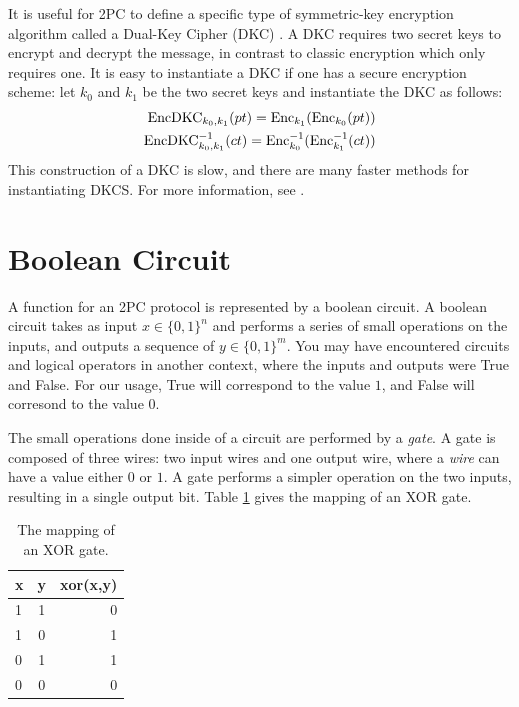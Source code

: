 It is useful for 2PC to define a specific type of symmetric-key encryption algorithm called a Dual-Key Cipher (DKC) \cite{bellare2012foundations}.
A DKC requires two secret keys to encrypt and decrypt the message, in contrast to classic encryption which only requires one.
It is easy to instantiate a DKC if one has a secure encryption scheme: let $k_0$ and $k_1$ be the two secret keys and instantiate the DKC as follows:
\begin{equation}
    \begin{split}
        \operatorname{EncDKC}_{k_0, k_1}(pt) = \operatorname{Enc}_{k_1} ( \operatorname{Enc}_{k_0} ( pt )) \\
        \operatorname{EncDKC}^{-1}_{k_0, k_1}(ct) = \operatorname{Enc}^{-1}_{k_0} ( \operatorname{Enc}^{-1}_{k_1} ( ct )) 
    \end{split}
\end{equation}
This construction of a DKC is slow, and there are many faster methods for instantiating DKCS.
For more information, see \cite{bellare2012foundations}.

\section{Boolean Circuit} 
A function for an 2PC protocol is represented by a boolean circuit.
A boolean circuit takes as input $x \in \{0,1\}^n$ and performs a series of small operations on the inputs, and outputs a sequence of $y \in \{0,1\}^m$. 
You may have encountered circuits and logical operators in another context, where the inputs and outputs were True and False.
For our usage, True will correspond to the value $1$, and False will corresond to the value $0$. 

The small operations done inside of a circuit are performed by a \emph{gate}.
A gate is composed of three wires: two input wires and one output wire, where a \emph{wire} can have a value either $0$ or $1$.
A gate performs a simpler operation on the two inputs, resulting in a single output bit.
Table \ref{tab:xor} gives the mapping of an XOR gate.

\begin{table}[h]
\label{tab:xor}
\centering
\begin{tabular}{ | l | c || r |}
\hline
x & y & xor(x,y) \\ \hline
1 & 1 & 0 \\ \hline
1 & 0 & 1 \\ \hline
0 & 1 & 1 \\ \hline
0 & 0 & 0 \\ \hline
\end{tabular}
\caption{The mapping of an XOR gate.}
\end{table}

